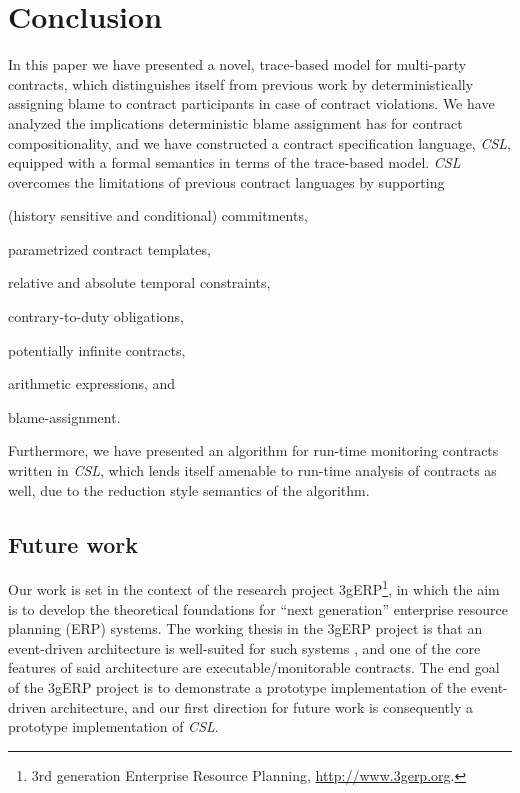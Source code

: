 \documentclass[orivec,final]{llncs-href}
\newcommand{\csl}{\textit{CSL}}
\begin{document}
\section{Conclusion}\label{sec:conclusion}
In this paper we have presented a novel, trace-based model for
multi-party contracts, which distinguishes itself from previous work
by deterministically assigning blame to contract participants in case
of contract violations. We have analyzed the implications
deterministic blame assignment has for contract compositionality, and
we have constructed a contract specification language, \csl{},
equipped with a formal semantics in terms of the trace-based model. \csl{}
overcomes the limitations of previous contract languages by supporting
\begin{inparaenum}[(a)]
\item (history sensitive and conditional) commitments,
\item parametrized contract templates,
\item relative and absolute temporal constraints,
\item contrary-to-duty obligations,
\item potentially infinite contracts,
\item arithmetic expressions, and
\item blame-assignment.
\end{inparaenum}
Furthermore, we have presented an algorithm for run-time monitoring
contracts written in \csl{}, which lends itself amenable to run-time
analysis of contracts as well, due to the reduction style semantics of
the algorithm.

\subsection{Future work}\label{sec:futurework}
Our work is set in the context of the research project
3gERP\footnote{3rd generation Enterprise Resource Planning,
  \url{http://www.3gerp.org}.}, in which the aim is to develop the
theoretical foundations for ``next generation'' enterprise resource
planning (ERP) systems. The working thesis in the 3gERP project is
that an event-driven architecture is well-suited for such systems
\cite{henglein09poets}, and one of the core features of said
architecture are executable/monitorable contracts. The end goal of the
3gERP project is to demonstrate a prototype implementation of the
event-driven architecture, and our first direction for future work is
consequently a prototype implementation of \csl{}.
\end{document}
